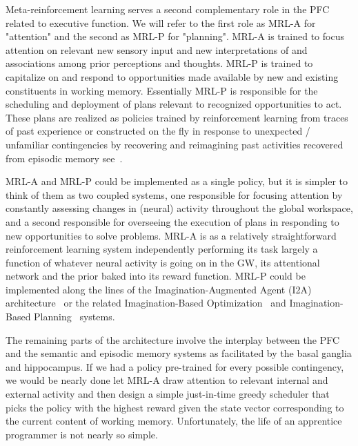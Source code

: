 
Meta-reinforcement learning serves a second complementary role in the PFC related to executive function. We will refer to the first role as MRL-A for "attention" and the second as MRL-P for "planning". MRL-A is trained to focus attention on relevant new sensory input and new interpretations of and associations among prior perceptions and thoughts. MRL-P is trained to capitalize on and respond to opportunities made available by new and existing constituents in working memory. Essentially MRL-P is responsible for the scheduling and deployment of plans relevant to recognized opportunities to act. These plans are realized as policies trained by reinforcement learning from traces of past experience or constructed on the fly in response to unexpected / unfamiliar contingencies by recovering and reimagining past activities recovered from episodic memory \emdash{} see~{{}}.

MRL-A and MRL-P could be implemented as a single policy, but it is simpler to think of them as two coupled systems, one responsible for focusing attention by constantly assessing changes in (neural) activity throughout the global workspace, and a second responsible for overseeing the execution of plans in responding to new opportunities to solve problems. MRL-A is as a relatively straightforward reinforcement learning system independently performing its task largely a function of whatever neural activity is going on in the GW, its attentional network and the prior baked into its reward function. MRL-P could be implemented along the lines of the Imagination-Augmented Agent (I2A) architecture~\cite{WeberetalCoRR-17} or the related Imagination-Based Optimization~\cite{HamricketalCoRR-17} and Imagination-Based Planning~\cite{PascanuetalCoRR-17} systems.


The remaining parts of the architecture involve the interplay between the PFC and the semantic and episodic memory systems as facilitated by the basal ganglia and hippocampus. If we had a policy pre-trained for every possible contingency, we would be nearly done \emdash{} let MRL-A draw attention to relevant internal and external activity and then design a simple just-in-time greedy scheduler that picks the policy with the highest reward given the state vector corresponding to the current content of working memory. Unfortunately, the life of an apprentice programmer is not nearly so simple.

